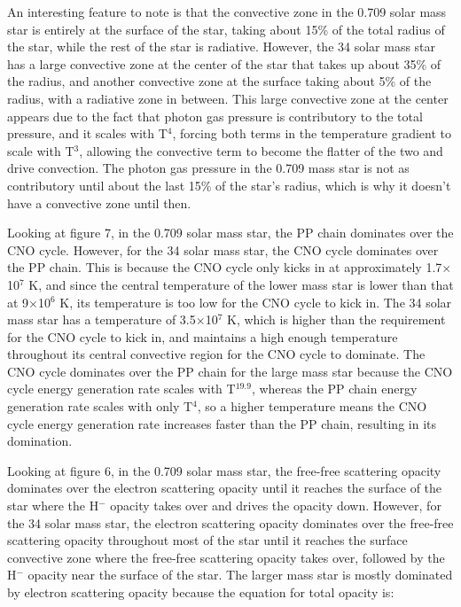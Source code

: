 \documentclass[11pt]{article}
\begin{document}
\newpage
\null
\newpage

An interesting feature to note is that the convective zone in the 0.709 solar mass star is entirely at the surface of the star, taking about 15\% of the total radius of the star, while the rest of the star is radiative. However, the 34 solar mass star has a large convective zone at the center of the star that takes up about 35\% of the radius, and another convective zone at the surface taking about 5\% of the radius, with a radiative zone in between. This large convective zone at the center appears due to the fact that photon gas pressure is contributory to the total pressure, and it scales with T$^4$, forcing both terms in the temperature gradient to scale with T$^3$, allowing the convective term to become the flatter of the two and drive convection. The photon gas pressure in the 0.709 mass star is not as contributory until about the last 15\% of the star's radius, which is why it doesn't have a convective zone until then.

Looking at figure 7, in the 0.709 solar mass star, the PP chain dominates over the CNO cycle. However, for the 34 solar mass star, the CNO cycle dominates over the PP chain. This is because the CNO cycle only kicks in at approximately 1.7$\times$10$^7$ K, and since the central temperature of the lower mass star is lower than that at 9$\times$10$^6$ K, its temperature is too low for the CNO cycle to kick in. The 34 solar mass star has a temperature of 3.5$\times$10$^7$ K, which is higher than the requirement for the CNO cycle to kick in, and maintains a high enough temperature throughout its central convective region for the CNO cycle to dominate. The CNO cycle dominates over the PP chain for the large mass star because the CNO cycle energy generation rate scales with T$^19.9$, whereas the PP chain energy generation rate scales with only T$^4$, so a higher temperature means the CNO cycle energy generation rate increases faster than the PP chain, resulting in its domination.

Looking at figure 6, in the 0.709 solar mass star, the free-free scattering opacity dominates over the electron scattering opacity until it reaches the surface of the star where the H$^-$ opacity takes over and drives the opacity down. However, for the 34 solar mass star, the electron scattering opacity dominates over the free-free scattering opacity throughout most of the star until it reaches the surface convective zone where the free-free scattering opacity takes over, followed by the H$^-$ opacity near the surface of the star. The larger mass star is mostly dominated by electron scattering opacity because the equation for total opacity is:
\end{document}
